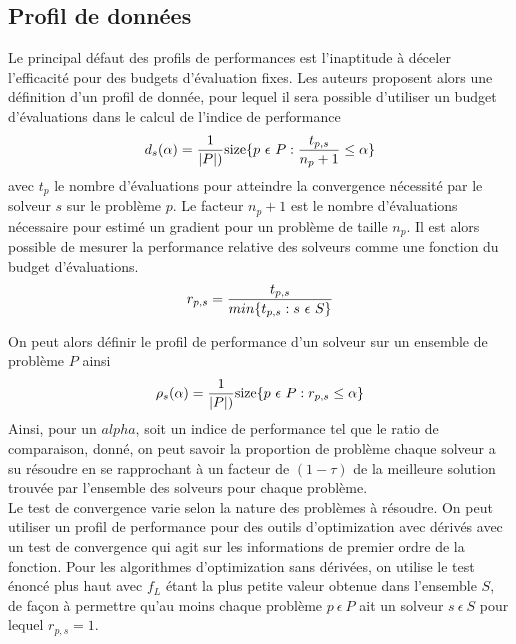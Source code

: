 \documentclass[letterpaper]{scrartcl}
\begin{document}
\subsection{Profil de données}
Le principal défaut des profils de performances est l'inaptitude à déceler l'efficacité pour des budgets d'évaluation fixes. Les auteurs proposent alors une définition d'un profil de donnée, pour lequel il sera possible d'utiliser un budget d'évaluations dans le calcul de l'indice de performance 
\begin{equation}
d_s(\alpha)=\frac{1}{|P|)}\text{size}\{p\ \epsilon \ P : \frac{t_{p,s}}{n_p+1} \leq \alpha \}\\
\end{equation}
avec $t_p$ le nombre d'évaluations pour atteindre la convergence nécessité par le solveur $s$ sur le problème $p$. Le facteur $n_p+1$ est le nombre d'évaluations nécessaire pour estimé un gradient pour un problème de taille $n_p$. Il est alors possible de mesurer la performance relative des solveurs comme une fonction du budget d'évaluations. 
\begin{equation}
r_{p,s}=\frac{t_{p,s}}{min\{t_{p,s} : s\  \epsilon \  S\}}\\
\end{equation}

On peut alors définir le profil de performance d'un solveur sur un ensemble de problème $P$ ainsi
\begin{equation}
\rho_s(\alpha)=\frac{1}{|P|)}\text{size}\{p\ \epsilon \ P : r_{p,s} \leq \alpha \}\\
\end{equation}
Ainsi, pour un $alpha$, soit un indice de performance tel que le ratio de comparaison,  donné, on peut savoir la proportion de problème chaque solveur a su résoudre en se rapprochant à un facteur de $(1-\tau)$ de la meilleure solution trouvée par l'ensemble des solveurs pour chaque problème. \\
Le test de convergence varie selon la nature des problèmes à résoudre. On peut utiliser un profil de performance pour des outils d'optimization avec dérivés avec un test de convergence qui agit sur les informations de premier ordre de la fonction. Pour les algorithmes d'optimization sans dérivées, on utilise le test énoncé plus haut avec $f_L$ étant la plus petite valeur obtenue dans l'ensemble $S$, de façon à permettre qu'au moins chaque problème $p \ \epsilon \ P$ ait un solveur $s \ \epsilon \ S$ pour lequel $r_{p,s}=1$.\\
\end{document}
